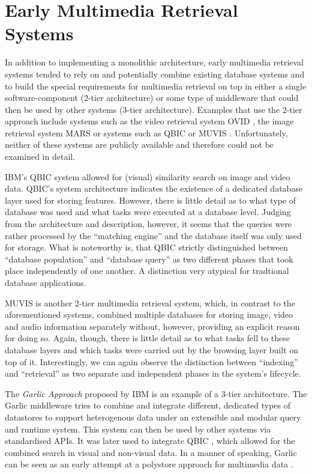 \section{Early Multimedia Retrieval Systems}

In addition to implementing a monolithic architecture, early multimedia retrieval systems tended to rely on and potentially combine existing database systems and to build the special requirements for multimedia retrieval on top in either a single software-component (2-tier architecture) or some type of middleware that could then be used by other systems (3-tier architecture). Examples that use the 2-tier approach include systems such as the video retrieval system OVID \cite{Oomoto:1993OVID}, the image retrieval system MARS \cite{Rui:1997Content} or systems such as QBIC \cite{Flickner:1995Query} or MUVIS \cite{Kiranyaz:2003Muvis}. Unfortunately, neither of these systems are publicly available and therefore could not be examined in detail.

IBM's QBIC system \cite{Flickner:1995Query} allowed for (visual) similarity search on image and video data. QBIC's system architecture indicates the existence of a dedicated database layer used for storing features. However, there is little detail as to what type of database was used and what tasks were executed at a database level. Judging from the architecture and description, however, it seems that the queries were rather processed by the ``matching engine'' and the database itself was only used for storage. What is noteworthy is, that QBIC strictly distinguished between ``database population'' and ``database query'' as two different phases that took place independently of one another. A distinction very atypical for tradtional database applications.

MUVIS \cite{Kiranyaz:2003Muvis} is another 2-tier multimedia retrieval system, which, in contrast to the aforementioned systems, combined multiple databases for storing image, video and audio information separately without, however, providing an explicit reason for doing so. Again, though, there is little detail as to what tasks fell to these database layers and which tasks were carried out by the browsing layer built on top of it. Interestingly, we can again observe the distinction between ``indexing'' and ``retrieval'' as two separate and independent phases in the system's lifecycle.

The \emph{Garlic Approach} \cite{Carey:1995Towards} proposed by IBM is an example of a 3-tier architecture. The Garlic middleware tries to combine and integrate different, dedicated types of datastores to support heterogenous data under an extensible and modular query and runtime system. This system can then be used by other systems via standardised APIs. It was later used to integrate QBIC \cite{Cody:1995Querying}, which allowed for the combined search in visual and non-visual data. In a manner of speaking, Garlic can be seen as an early attempt at a polystore approach for multimedia data \cite{Vogt:2018Polypheny}. 

